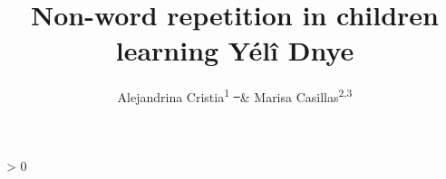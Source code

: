 \documentclass[ %
american, %
,man,floatsintext]{apa6} %
\let\LanguageShortHands\languageshorthands %
\def\languageshorthands#1{} %
\newlength{\cslhangindent} %
\newlength{\csllabelwidth} %
\newenvironment{CSLReferences}[2] %
{%
	\setlength{\parindent}{0pt} %
	\ifodd #1 \everypar{\setlength{\hangindent}{\cslhangindent}}\ignorespaces\fi %
	\ifnum #2 > 0 %
	\setlength{\parskip}{#2\baselineskip} %
	\fi %
}%
{} %
\newcommand{\CSLBlock}[1]{#1\hfill\break} %
\newcommand{\CSLLeftMargin}[1]{\parbox[t]{\csllabelwidth}{#1}} %
\newcommand{\CSLRightInline}[1]{\parbox[t]{\linewidth - \csllabelwidth}{#1}\break} %
\newcommand{\CSLIndent}[1]{\hspace{\cslhangindent}#1} %
\providecommand{\DIFdeltex}[1]{{\protect\color{red}\sout{#1}}}                      %
\providecommand{\DIFdelbegin}{} %
\providecommand{\DIFdelend}{} %
\providecommand{\DIFdel}[1]{\texorpdfstring{\DIFdeltex{#1}}{}} %
\newcommand{\DIFscaledelfig}{0.5}
\newlength{\DIFdelgraphicswidth} %
\newlength{\DIFdelgraphicsheight} %
\newcommand{\DIFdelincludegraphics}[2][]{%
	\sbox{\DIFdelgraphicsbox}{\DIFOincludegraphics[#1]{#2}}%
	\settoboxwidth{\DIFdelgraphicswidth}{\DIFdelgraphicsbox} %
	\settoboxtotalheight{\DIFdelgraphicsheight}{\DIFdelgraphicsbox} %
	\scalebox{\DIFscaledelfig}{%
		\parbox[b]{\DIFdelgraphicswidth}{\usebox{\DIFdelgraphicsbox}\\[-\baselineskip] \rule{\DIFdelgraphicswidth}{0em}}\llap{\resizebox{\DIFdelgraphicswidth}{\DIFdelgraphicsheight}{%
				\setlength{\unitlength}{\DIFdelgraphicswidth}%
				\begin{picture}(1,1)%
				\thicklines\linethickness{2pt} %
				{\color[rgb]{1,0,0}\put(0,0){\framebox(1,1){}}}%
				{\color[rgb]{1,0,0}\put(0,0){\line( 1,1){1}}}%
				{\color[rgb]{1,0,0}\put(0,1){\line(1,-1){1}}}%
				\end{picture}%
			}\hspace*{3pt}}} %
} %
\DeclareRobustCommand{\DIFdelbegin}{\DIFOdelbegin \let\includegraphics\DIFdelincludegraphics} %
\DeclareRobustCommand{\DIFdelend}{\DIFOaddend \let\includegraphics\DIFOincludegraphics} %
\begin{document}
\begin{CSLReferences}{1}{0}
\linenumbers
\usepackage{csquotes}
\ifxetex %
\usepackage{polyglossia}
\setmainlanguage[variant=american]{english} %
\else %
\usepackage[main=american]{babel} %
\let\LanguageShortHands\languageshorthands %
\def\languageshorthands#1{} %
\fi
\ifluatex %
\usepackage{selnolig}  %
\fi %
\newlength{\cslhangindent} %
\setlength{\cslhangindent}{1.5em} %
\newlength{\csllabelwidth} %
\setlength{\csllabelwidth}{3em} %
\newenvironment{CSLReferences}[2] %
{%
	\setlength{\parindent}{0pt} %
	\ifodd #1 \everypar{\setlength{\hangindent}{\cslhangindent}}\ignorespaces\fi %
	\ifnum #2 > 0 %
	\setlength{\parskip}{#2\baselineskip} %
	\fi %
}%
{} %
\usepackage{calc} %
\newcommand{\CSLBlock}[1]{#1\hfill\break} %
\newcommand{\CSLLeftMargin}[1]{\parbox[t]{\csllabelwidth}{#1}} %
\newcommand{\CSLRightInline}[1]{\parbox[t]{\linewidth - \csllabelwidth}{#1}\break} %
\newcommand{\CSLIndent}[1]{\hspace{\cslhangindent}#1} %

\title{Non-word repetition in children learning Yélî Dnye}
\author{Alejandrina Cristia\textsuperscript{1} \DIFdelbegin \DIFdel{\ }\DIFdelend \& Marisa Casillas\textsuperscript{2,3}} %
\date{}


\end{CSLReferences}
\end{document}
